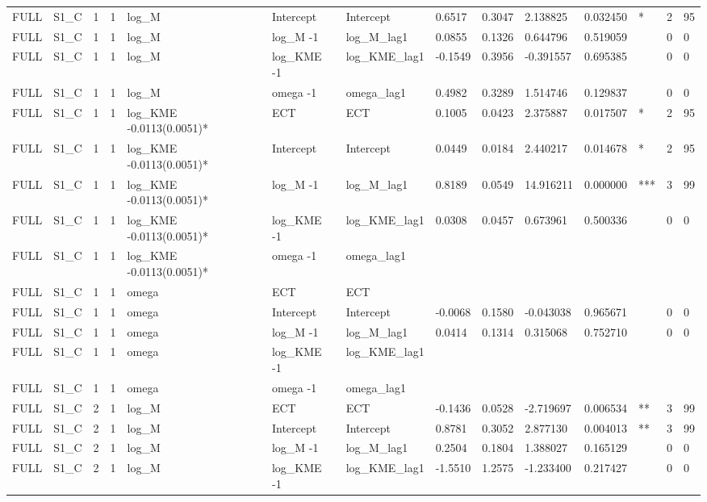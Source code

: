 \begin{tabular}{llllllllllllll}
FULL & S1\_C & 1 & 1 & log\_M & Intercept & Intercept & 0.6517 & 0.3047 & 2.138825 & 0.032450 & * & 2 & 95 \\
FULL & S1\_C & 1 & 1 & log\_M & log\_M -1 & log\_M\_lag1 & 0.0855 & 0.1326 & 0.644796 & 0.519059 &  & 0 & 0 \\
FULL & S1\_C & 1 & 1 & log\_M & log\_KME -1 & log\_KME\_lag1 & -0.1549 & 0.3956 & -0.391557 & 0.695385 &  & 0 & 0 \\
FULL & S1\_C & 1 & 1 & log\_M & omega -1 & omega\_lag1 & 0.4982 & 0.3289 & 1.514746 & 0.129837 &  & 0 & 0 \\
FULL & S1\_C & 1 & 1 & log\_KME -0.0113(0.0051)* & ECT & ECT & 0.1005 & 0.0423 & 2.375887 & 0.017507 & * & 2 & 95 \\
FULL & S1\_C & 1 & 1 & log\_KME -0.0113(0.0051)* & Intercept & Intercept & 0.0449 & 0.0184 & 2.440217 & 0.014678 & * & 2 & 95 \\
FULL & S1\_C & 1 & 1 & log\_KME -0.0113(0.0051)* & log\_M -1 & log\_M\_lag1 & 0.8189 & 0.0549 & 14.916211 & 0.000000 & *** & 3 & 99 \\
FULL & S1\_C & 1 & 1 & log\_KME -0.0113(0.0051)* & log\_KME -1 & log\_KME\_lag1 & 0.0308 & 0.0457 & 0.673961 & 0.500336 &  & 0 & 0 \\
FULL & S1\_C & 1 & 1 & log\_KME -0.0113(0.0051)* & omega -1 & omega\_lag1 &  &  &  &  &  &  &  \\
FULL & S1\_C & 1 & 1 & omega & ECT & ECT &  &  &  &  &  &  &  \\
FULL & S1\_C & 1 & 1 & omega & Intercept & Intercept & -0.0068 & 0.1580 & -0.043038 & 0.965671 &  & 0 & 0 \\
FULL & S1\_C & 1 & 1 & omega & log\_M -1 & log\_M\_lag1 & 0.0414 & 0.1314 & 0.315068 & 0.752710 &  & 0 & 0 \\
FULL & S1\_C & 1 & 1 & omega & log\_KME -1 & log\_KME\_lag1 &  &  &  &  &  &  &  \\
FULL & S1\_C & 1 & 1 & omega & omega -1 & omega\_lag1 &  &  &  &  &  &  &  \\
FULL & S1\_C & 2 & 1 & log\_M & ECT & ECT & -0.1436 & 0.0528 & -2.719697 & 0.006534 & ** & 3 & 99 \\
FULL & S1\_C & 2 & 1 & log\_M & Intercept & Intercept & 0.8781 & 0.3052 & 2.877130 & 0.004013 & ** & 3 & 99 \\
FULL & S1\_C & 2 & 1 & log\_M & log\_M -1 & log\_M\_lag1 & 0.2504 & 0.1804 & 1.388027 & 0.165129 &  & 0 & 0 \\
FULL & S1\_C & 2 & 1 & log\_M & log\_KME -1 & log\_KME\_lag1 & -1.5510 & 1.2575 & -1.233400 & 0.217427 &  & 0 & 0 \\

\end{tabular}
